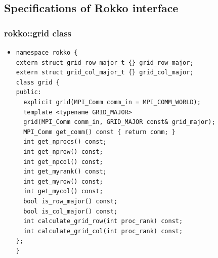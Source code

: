 



\subsection{Specifications of Rokko interface}

\begin{frame}[c,fragile]
  \frametitle{rokko::grid class}
  \begin{itemize}
  \item {}
\begin{lstlisting}
namespace rokko {
extern struct grid_row_major_t {} grid_row_major;
extern struct grid_col_major_t {} grid_col_major;
class grid {
public:
  explicit grid(MPI_Comm comm_in = MPI_COMM_WORLD);
  template <typename GRID_MAJOR>
  grid(MPI_Comm comm_in, GRID_MAJOR const& grid_major);
  MPI_Comm get_comm() const { return comm; }
  int get_nprocs() const;
  int get_nprow() const;
  int get_npcol() const;
  int get_myrank() const;
  int get_myrow() const;
  int get_mycol() const;
  bool is_row_major() const;
  bool is_col_major() const;
  int calculate_grid_row(int proc_rank) const;
  int calculate_grid_col(int proc_rank) const;
};
}
\end{lstlisting}
  \end{itemize}
\end{frame}


